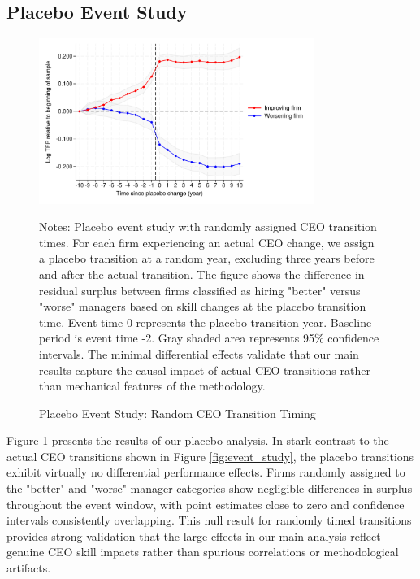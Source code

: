 \documentclass[11pt,a4paper]{article}
\begin{document}
\subsection{Placebo Event Study}

\begin{figure}[htbp]
\centering
\includegraphics[width=0.8\textwidth]{figure/placebo.pdf}
\caption{Placebo Event Study: Random CEO Transition Timing}
\label{fig:placebo}
\footnotesize
Notes: Placebo event study with randomly assigned CEO transition times. For each firm experiencing an actual CEO change, we assign a placebo transition at a random year, excluding three years before and after the actual transition. The figure shows the difference in residual surplus between firms classified as hiring "better" versus "worse" managers based on skill changes at the placebo transition time. Event time 0 represents the placebo transition year. Baseline period is event time -2. Gray shaded area represents 95\% confidence intervals. The minimal differential effects validate that our main results capture the causal impact of actual CEO transitions rather than mechanical features of the methodology.
\end{figure}

Figure \ref{fig:placebo} presents the results of our placebo analysis. In stark contrast to the actual CEO transitions shown in Figure \ref{fig:event_study}, the placebo transitions exhibit virtually no differential performance effects. Firms randomly assigned to the "better" and "worse" manager categories show negligible differences in surplus throughout the event window, with point estimates close to zero and confidence intervals consistently overlapping. This null result for randomly timed transitions provides strong validation that the large effects in our main analysis reflect genuine CEO skill impacts rather than spurious correlations or methodological artifacts.




\end{document}
